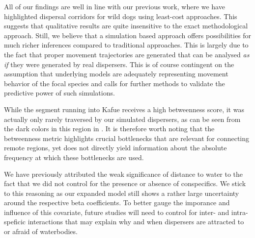 \documentclass[abstract=on,10pt,a4paper,bibliography=totocnumbered]{article}
\begin{document}
All of our findings are well in line with our previous work, where we have
highlighted dispersal corridors for wild dogs using least-cost approaches. This
suggests that qualitative results are quite insensitive to the exact
methodological approach. Still, we believe that a simulation based approach
offers possibilities for much richer inferences compared to traditional
approaches. This is largely due to the fact that proper movement trajectories
are generated that can be analysed \textit{as if} they were generated by real
dispersers. This is of course contingent on the assumption that underlying
models are adequately representing movement behavior of the focal species and
calls for further methods to validate the predictive power of such simulations.

While the segment running into Kafue receives a high betweenness score, it was
actually only rarely traversed by our simulated dispersers, as can be seen from
the dark colors in this region in . It is therefore worth noting
that the betweenness metric highlights crucial bottlenecks that are relevant for
connecting remote regions, yet does not directly yield information about the
absolute frequency at which these bottlenecks are used.

We have previously attributed the weak significance of distance to water to the
fact that we did not control for the presence or absence of conspecifics. We
stick to this reasoning as our expanded model still shows a rather large
uncertainty around the respective beta coefficients. To better gauge the
imporance and influence of this covariate, future studies will need to control
for inter- and intra-speficic interactions that may explain why and when
dispersers are attracted to or afraid of waterbodies.
\end{document}
